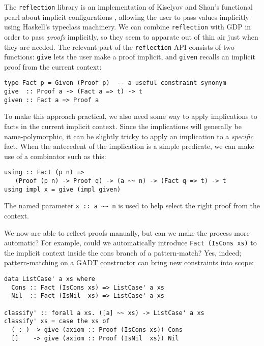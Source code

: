 \documentclass[format=sigplan, review=false, screen=true, 10pt]{acmart}
\makeatletter
\let\origsubsection\subsection
\renewcommand\subsection{\@ifstar{\starsubsection}{\nostarsubsection}}
\newcommand\nostarsubsection[1]
{\subsectionprelude\origsubsection{#1}\subsectionpostlude}
\newcommand\starsubsection[1]
{\subsectionprelude\origsubsection*{#1}\subsectionpostlude}
\newcommand\subsectionprelude{%
  \vspace{-0.25em}
}
\newcommand\subsectionpostlude{%
  \vspace{-0.05em}
}
\makeatother
\begin{document}
\subsection{Using Reflection to Pass Implicit Proofs}
The \texttt{reflection} library is an implementation of Kiselyov and Shan's functional pearl about implicit configurations \cite{kiselyov2004functional}, allowing the user to pass values implicitly using Haskell's typeclass machinery.
We can combine \texttt{reflection} with GDP in order to pass \emph{proofs} implicitly, so they seem to apparate out of thin air
just when they are needed.
 The relevant part of the \texttt{reflection}
API consists of two functions: \texttt{give} lets the user make a proof implicit, and \texttt{given}
recalls an implicit proof from the current context:
\begin{verbatim}
type Fact p = Given (Proof p)  -- a useful constraint synonym
give  :: Proof a -> (Fact a => t) -> t
given :: Fact a => Proof a
\end{verbatim}

To make this approach practical, we also need some way to apply implications to facts in the current implicit context. Since the implications will generally be name-polymorphic, it can be
slightly tricky to apply an implication to a \emph{specific} fact. When the antecedent of the implication
is a simple predicate, we can make use of a combinator such as this:
\begin{verbatim}
using :: Fact (p n) =>
   (Proof (p n) -> Proof q) -> (a ~~ n) -> (Fact q => t) -> t
using impl x = give (impl given)
\end{verbatim}
The named parameter \verb|x :: a ~~ n| is used to help select the right proof from the context.

We now are able to reflect proofs manually, but can we make the process more automatic? For example,
could we automatically introduce \texttt{Fact (IsCons xs)} to the implicit context inside the cons branch of
a pattern-match?
Yes, indeed; pattern-matching on a GADT constructor can bring new constraints into scope:

\begin{verbatim}
data ListCase' a xs where
  Cons :: Fact (IsCons xs) => ListCase' a xs
  Nil  :: Fact (IsNil  xs) => ListCase' a xs

classify' :: forall a xs. ([a] ~~ xs) -> ListCase' a xs
classify' xs = case the xs of
  (_:_) -> give (axiom :: Proof (IsCons xs)) Cons
  []    -> give (axiom :: Proof (IsNil  xs)) Nil
\end{verbatim}
\end{document}
